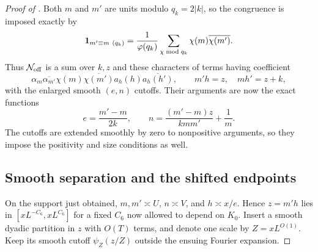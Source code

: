 \begin{proof}[Proof of ]
Both $m$ and $m'$ are units modulo $q_k=2|k|$, so the congruence is
imposed exactly by
\begin{equation}\label{eq:typeii-character-congruence}
 \mathbf 1_{m'\equiv m\ (q_k)}
       =\frac1{\varphi(q_k)}\sum_{\chi\bmod q_k}
                                  \chi(m)\overline{\chi(m')}.
\end{equation}
Thus $\mathcal N_{\rm off}$ is a sum over $k,z$ and these characters
of terms having coefficient
\[
 \alpha_m\overline{\alpha_{m'}}\chi(m)\overline{\chi(m')}
                    a_h(h)\overline{a_h(h')},
 \qquad m'h=z,\quad mh'=z+k,
\]
with the enlarged smooth $(e,n)$ cutoffs. Their arguments are now the
exact functions
\begin{equation}\label{eq:typeii-pulled-back}
       e=\frac{m'-m}{2k},\qquad
       n=\frac{(m'-m)z}{kmm'}+\frac1m.
\end{equation}
The cutoffs are extended smoothly by zero to nonpositive arguments,
so they impose the positivity and size conditions as well.

\subsection{Smooth separation and the shifted endpoints}

On the support just obtained, $m,m'\asymp U$, $n\asymp V$, and
$h\asymp x/e$. Hence $z=m'h$ lies in
$[xL^{-C_6},xL^{C_6}]$ for a fixed $C_6$ now allowed to depend on
$K_0$. Insert a smooth dyadic partition in $z$ with $O(T)$ terms,
and denote one scale by $Z=xL^{O(1)}$. Keep its smooth cutoff
$\psi_Z(z/Z)$ outside the ensuing Fourier expansion.


\end{proof}
